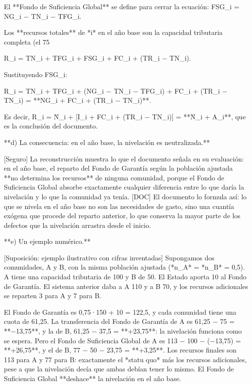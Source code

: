 \documentclass[10pt,a4paper]{article}
\begin{document}
El **Fondo de Suficiencia Global** se define para cerrar la ecuación: FSG_i = NG_i − TN_i − TFG_i.

Los **recursos totales** de *i* en el año base son la capacidad tributaria completa (el 75%

R_i = TN_i + TFG_i + FSG_i + FC_i + (TR_i − TN_i).

Sustituyendo FSG_i:

R_i = TN_i + TFG_i + (NG_i − TN_i − TFG_i) + FC_i + (TR_i − TN_i) = **NG_i + FC_i + (TR_i − TN_i)**.

Es decir, R_i = N̄_i + [I_i + FC_i + (TR_i − TN_i)] = **N̄_i + A_i**, que es la conclusión del documento.

**d) La consecuencia: en el año base, la nivelación es neutralizada.**

[Seguro] La reconstrucción muestra lo que el documento señala en su evaluación: en el año base, el reparto del Fondo de Garantía según la población ajustada **no determina los recursos** de ninguna comunidad, porque el Fondo de Suficiencia Global absorbe exactamente cualquier diferencia entre lo que daría la nivelación y lo que la comunidad ya tenía. [DOC] El documento lo formula así: lo que se nivela en el año base no son las necesidades de gasto, sino una cuantía exógena que procede del reparto anterior, lo que conserva la mayor parte de los defectos que la nivelación arrastra desde el inicio.

**e) Un ejemplo numérico.**

[Suposición: ejemplo ilustrativo con cifras inventadas] Supongamos dos comunidades, A y B, con la misma población ajustada (*n_A* = *n_B* = 0,5). A tiene una capacidad tributaria de 100 y B de 50. El Estado aporta 10 al Fondo de Garantía. El sistema anterior daba a A 110 y a B 70, y los recursos adicionales se reparten 3 para A y 7 para B.

El Fondo de Garantía es 0,75·150 + 10 = 122,5, y cada comunidad tiene una cuota de 61,25. La transferencia del Fondo de Garantía de A es 61,25 − 75 = **−13,75**, y la de B, 61,25 − 37,5 = **+23,75**: la nivelación funciona como se espera. Pero el Fondo de Suficiencia Global de A es 113 − 100 − (−13,75) = **+26,75**, y el de B, 77 − 50 − 23,75 = **+3,25**. Los recursos finales son 113 para A y 77 para B: exactamente el *statu quo* más los recursos adicionales, pese a que la nivelación decía que ambas debían tener lo mismo. El Fondo de Suficiencia Global **deshace** la nivelación en el año base.
\end{document}
